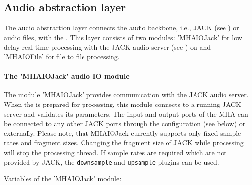 
\subsection{Audio abstraction layer}%
\label{sec:audioabstraction}

The audio abstraction layer connects the audio backbone, i.e.,
JACK (see ) or audio files, with the \mhad{}.
%
This layer consists of two modules: 'MHAIOJack' for low delay real
time processing with the JACK audio server (see )
on \Linux{} and 'MHAIOFile' for file to file processing.

\paragraph{The 'MHAIOJack' audio IO module}%
%
%

The module 'MHAIOJack' provides communication with the JACK audio
server.
%
When the \mhad{} is prepared for processing, this module connects to a
running JACK server and validates its parameters. The input and output
ports of the MHA can be connected to any other JACK ports through the
\mha{} configuration (see below) or externally. Please note, that
MHAIOJack currently supports only fixed sample rates and fragment
sizes. Changing the fragment size of JACK while processing will stop
the \mha{} processing thread. If sample rates are required which are not
provided by JACK, the {\tt downsample} and {\tt upsample} plugins can
be used. 

Variables of the 'MHAIOJack' module:

\begin{description}





\end{description}

